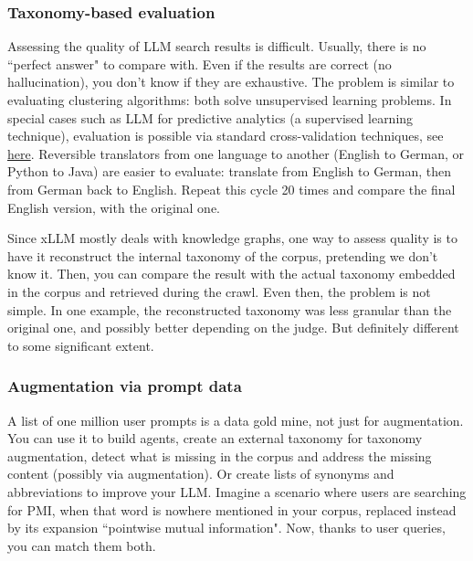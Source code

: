 \documentclass[10pt]{article}
\begin{document}
{\subsubsection{Taxonomy-based evaluation}
Assessing the quality of LLM search results is difficult. Usually, there is no ``perfect answer" to compare with. Even if the results are correct (no \textcolor{index}{hallucination}), you don't know if they are exhaustive. The problem is similar to evaluating clustering algorithms: both solve unsupervised learning problems. In special cases such as LLM for predictive analytics (a supervised learning technique), \textcolor{index}{evaluation} is possible via standard 
\textcolor{index}{cross-validation} techniques, see \href{https://mltblog.com/3y50Rt2}{here}. Reversible translators from one language to another (English to German, or Python to Java) are easier to evaluate: translate from English to German, then from German back to English. Repeat this cycle 20 times and compare the final English version, with the original one.

Since xLLM mostly deals with \textcolor{index}{knowledge graphs}, one way to assess quality is to have it reconstruct the internal taxonomy of the corpus, pretending we don’t know it. Then, you can compare the result with the actual taxonomy embedded in the corpus and retrieved during the crawl. Even then, the problem is not simple. In one example, the reconstructed taxonomy was less granular than the original one, and possibly better depending on the judge. But definitely different to some significant extent.

\subsubsection{Augmentation via prompt data}
A list of one million user prompts is a data gold mine, not just for \textcolor{index}{augmentation}. You can use it to build agents, create an external taxonomy for taxonomy augmentation, detect what is missing in the corpus and address the missing content (possibly via augmentation). Or create lists of synonyms and abbreviations to improve your LLM. Imagine a scenario where users are searching for PMI, when that word is nowhere mentioned in your corpus, replaced instead by its expansion ``pointwise mutual information". Now, thanks to user queries, you can match them both.

}
\end{document}
